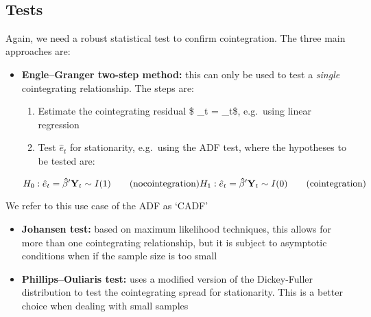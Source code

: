 \documentclass{article}
\begin{document}
    \begin{center}
    \end{center}
    { \hspace*{\fill} \\}
    
    \subsection{Tests}\label{tests}

Again, we need a robust statistical test to confirm cointegration. The
three main approaches are:

\begin{itemize}
\item
  \textbf{Engle--Granger two-step method:} this can only be used to test
  a \emph{single} cointegrating relationship. The steps are:

  \begin{enumerate}
  \def\labelenumi{(\roman{enumi})}
  \item
    Estimate the cointegrating residual \$ \_t =
    \mathbf{\hat{\beta}^\prime} \_t\$, e.g.~using linear
    regression
  \item
    Test \(\hat{e}_t\) for stationarity, e.g.~using the ADF test, where
    the hypotheses to be tested are:
  \end{enumerate}

  \[
  \begin{equation}
  H_0 \space :  \space \hat{e}_t = \mathbf{\hat{\beta}^\prime} \mathbf{Y}_t \sim I(1) \qquad \mathrm{(no \space cointegration)} \\
  H_1 \space :  \space \hat{e}_t = \mathbf{\hat{\beta}^\prime} \mathbf{Y}_t \sim I(0) \qquad \mathrm{(cointegration)}
  \end{equation}
  \]
\end{itemize}

We refer to this use case of the ADF as `CADF'

\begin{itemize}
\item
  \textbf{Johansen test:} based on maximum likelihood techniques, this
  allows for more than one cointegrating relationship, but it is subject
  to asymptotic conditions when if the sample size is too small
\item
  \textbf{Phillips--Ouliaris test:} uses a modified version of the
  Dickey-Fuller distribution to test the cointegrating spread for
  stationarity. This is a better choice when dealing with small samples
\end{itemize}
\end{document}
